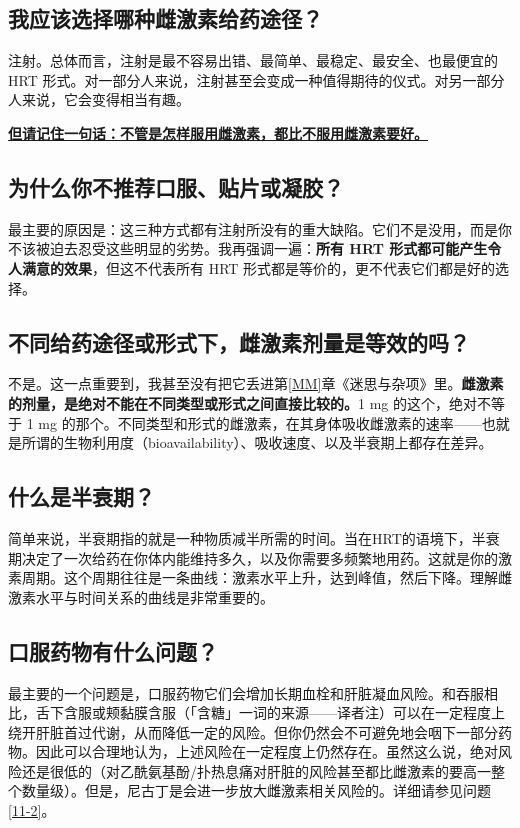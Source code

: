 \documentclass{article}
\begin{document}
\subsection{我应该选择哪种雌激素给药途径？}

注射。总体而言，注射是最不容易出错、最简单、最稳定、最安全、也最便宜的 HRT 形式。对一部分人来说，注射甚至会变成一种值得期待的仪式。对另一部分人来说，它会变得相当有趣。

\noindent\underline{\textbf{但请记住一句话：不管是怎样服用雌激素，都比不服用雌激素要好。}}

\subsection{为什么你不推荐口服、贴片或凝胶？}

最主要的原因是：这三种方式都有注射所没有的重大缺陷。它们不是没用，而是你不该被迫去忍受这些明显的劣势。我再强调一遍：\textbf{所有 HRT 形式都可能产生令人满意的效果}，但这不代表所有 HRT 形式都是等价的，更不代表它们都是好的选择。

\subsection{不同给药途径或形式下，雌激素剂量是等效的吗？}

不是。这一点重要到，我甚至没有把它丢进第\ref{MM}章《迷思与杂项》里。\textbf{雌激素的剂量，是绝对不能在不同类型或形式之间直接比较的。}1 mg 的这个，绝对不等于 1 mg 的那个。不同类型和形式的雌激素，在其身体吸收雌激素的速率——也就是所谓的生物利用度（bioavailability）、吸收速度、以及半衰期上都存在差异。

\subsection{什么是半衰期？}

简单来说，半衰期指的就是一种物质减半所需的时间。当在HRT的语境下，半衰期决定了一次给药在你体内能维持多久，以及你需要多频繁地用药。这就是你的激素周期。这个周期往往是一条曲线：激素水平上升，达到峰值，然后下降。理解雌激素水平与时间关系的曲线是非常重要的。

\subsection{口服药物有什么问题？}

最主要的一个问题是，口服药物它们会增加长期血栓和肝脏凝血风险。和吞服相比，舌下含服或颊黏膜含服（「含糖」一词的来源——译者注）可以在一定程度上绕开肝脏首过代谢，从而降低一定的风险。但你仍然会不可避免地会咽下一部分药物。因此可以合理地认为，上述风险在一定程度上仍然存在。虽然这么说，绝对风险还是很低的（对乙酰氨基酚/扑热息痛对肝脏的风险甚至都比雌激素的要高一整个数量级）。但是，尼古丁是会进一步放大雌激素相关风险的。详细请参见问题 \ref{11-2}。
\end{document}
